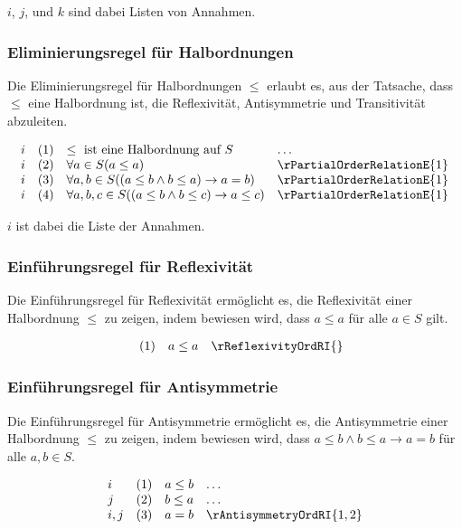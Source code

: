 \documentclass[main.tex]{subfiles}
\begin{document}
\(i\), \(j\), und \(k\) sind dabei Listen von Annahmen.

\subsubsection*{Eliminierungsregel für Halbordnungen}
\label{rule:rPartialOrderRelationE}
Die Eliminierungsregel für Halbordnungen \(\leq\) erlaubt es, aus der Tatsache, dass \(\leq\) eine Halbordnung ist, die Reflexivität, Antisymmetrie und Transitivität abzuleiten.

\[
\begin{array}{llll}
    i       & (1) & \leq \text{ ist eine Halbordnung auf } S & \dots \\
    i       & (2) & \forall a \in S (a \leq a) & \rPartialOrderRelationE{1} \\
    i       & (3) & \forall a, b \in S ((a \leq b \land b \leq a) \rightarrow a = b) & \rPartialOrderRelationE{1} \\
    i       & (4) & \forall a, b, c \in S ((a \leq b \land b \leq c) \rightarrow a \leq c) & \rPartialOrderRelationE{1}
\end{array}
\]

\(i\) ist dabei die Liste der Annahmen.

\subsubsection*{Einführungsregel für Reflexivität}
\label{rule:rReflexivityOrdRI}
Die Einführungsregel für Reflexivität ermöglicht es, die Reflexivität einer Halbordnung \(\leq\) zu zeigen, indem bewiesen wird, dass \(a \leq a\) für alle \(a \in S\) gilt.

\[
\begin{array}{llll}
          & (1) & a \leq a & \rReflexivityOrdRI{}
\end{array}
\]

\subsubsection*{Einführungsregel für Antisymmetrie}
\label{rule:rAntisymmetryOrdRI}
Die Einführungsregel für Antisymmetrie ermöglicht es, die Antisymmetrie einer Halbordnung \(\leq\) zu zeigen, indem bewiesen wird, dass \(a \leq b \land b \leq a \rightarrow a = b\) für alle \(a, b \in S\).

\[
\begin{array}{llll}
    i       & (1) & a \leq b & \dots \\
    j       & (2) & b \leq a & \dots \\
    i,j     & (3) & a = b & \rAntisymmetryOrdRI{1,2}
\end{array}
\]
\end{document}
